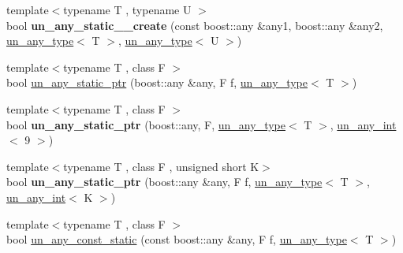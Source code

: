 \begin{DoxyCompactItemize}
\item 
\mbox{\label{group__boost__any__stuff_ga01efdc3a7c3d6fb8c8ee1443192d2ec3}} 
{\footnotesize template$<$typename T , typename U $>$ }\\bool {\bfseries un\+\_\+any\+\_\+static\+\_\+\_\+create} (const boost\+::any \&any1, boost\+::any \&any2, \mbox{\hyperlink{struct_s_m_spp__di__unipi__it_1_1un__any__type}{un\+\_\+any\+\_\+type}}$<$ T $>$, \mbox{\hyperlink{struct_s_m_spp__di__unipi__it_1_1un__any__type}{un\+\_\+any\+\_\+type}}$<$ U $>$)
\item 
{\footnotesize template$<$typename T , class F $>$ }\\bool \mbox{\hyperlink{group__boost__any__stuff_ga52fc4cc92fd415dd9ba1ae8b68f44931}{un\+\_\+any\+\_\+static\+\_\+ptr}} (boost\+::any \&any, F f, \mbox{\hyperlink{struct_s_m_spp__di__unipi__it_1_1un__any__type}{un\+\_\+any\+\_\+type}}$<$ T $>$)
\item 
\mbox{\label{group__boost__any__stuff_ga10a201725d1968bcaa63fc336a551a64}} 
{\footnotesize template$<$typename T , class F $>$ }\\bool {\bfseries un\+\_\+any\+\_\+static\+\_\+ptr} (boost\+::any, F, \mbox{\hyperlink{struct_s_m_spp__di__unipi__it_1_1un__any__type}{un\+\_\+any\+\_\+type}}$<$ T $>$, \mbox{\hyperlink{struct_s_m_spp__di__unipi__it_1_1un__any__int}{un\+\_\+any\+\_\+int}}$<$ 9 $>$)
\item 
\mbox{\label{group__boost__any__stuff_gaee2f3a7028d38a64ea7babd4feb8fcf8}} 
{\footnotesize template$<$typename T , class F , unsigned short K$>$ }\\bool {\bfseries un\+\_\+any\+\_\+static\+\_\+ptr} (boost\+::any \&any, F f, \mbox{\hyperlink{struct_s_m_spp__di__unipi__it_1_1un__any__type}{un\+\_\+any\+\_\+type}}$<$ T $>$, \mbox{\hyperlink{struct_s_m_spp__di__unipi__it_1_1un__any__int}{un\+\_\+any\+\_\+int}}$<$ K $>$)
\item 
{\footnotesize template$<$typename T , class F $>$ }\\bool \mbox{\hyperlink{group__boost__any__stuff_ga4d88b50d748bc8cbf4647b5db0ea44f0}{un\+\_\+any\+\_\+const\+\_\+static}} (const boost\+::any \&any, F f, \mbox{\hyperlink{struct_s_m_spp__di__unipi__it_1_1un__any__type}{un\+\_\+any\+\_\+type}}$<$ T $>$)
\item 
\mbox{\label{group__boost__any__stuff_ga3d2921ebd6cdac467dae75c112244d5c}} 

\end{DoxyCompactItemize}
